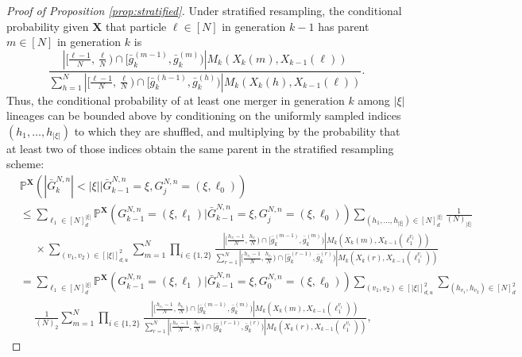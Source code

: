\documentclass[10pt,a4paper]{amsart}
\newcommand{\bbP}{\mathbb{P}}
\newcommand{\bfX}{\mathbf{X}}
\begin{document}
\begin{proof}[Proof of Proposition \ref{prop:stratified}]
Under stratified resampling, the conditional probability given $\bfX$ that particle $\ell \in [N]$ in generation $k - 1$ has parent $m \in [N]$ in generation $k$ is
\begin{equation*}
\frac{ | [ \frac{ \ell - 1 }{ N }, \frac{ \ell }{ N } ) \cap [ \bar{ g }_k^{ ( m - 1 ) }, \bar{ g }_k^{ ( m ) } ) | M_k( X_k( m ), X_{ k - 1 }( \ell ) ) }{ \sum_{ h = 1 }^N | [ \frac{ \ell - 1 }{ N }, \frac{ \ell }{ N } ) \cap [ \bar{ g }_k^{ ( h - 1 ) }, \bar{ g }_k^{ ( h ) } ) | M_k( X_k( h ), X_{ k - 1 }( \ell ) ) }.
\end{equation*}
Thus, the conditional probability of at least one merger in generation $k$ among $| \xi |$ lineages can be bounded above by conditioning on the uniformly sampled indices $( h_1, \ldots, h_{ | \xi | } )$ to which they are shuffled, and multiplying by the probability that at least two of those indices obtain the same parent in the stratified resampling scheme:
\begin{align*}
&\bbP^{ \bfX }( | \bar{ G }_k^{ N, n } | < | \xi | | \bar{ G }_{ k - 1 }^{ N, n } = \xi, G_j^{ N, n } = ( \xi, \ell_0 ) ) \\
&\leq \sum_{ \ell_1 \in [ N ]_d^{ | \xi | } } \bbP^{ \bfX }( G_{ k - 1 }^{ N, n } = ( \xi, \ell_1 ) | \bar{ G }_{ k - 1 }^{ N, n } = \xi, G_j^{ N, n } = ( \xi, \ell_0 ) ) \sum_{ ( h_1, \ldots, h_{ | \xi | } ) \in [ N ]_d^{ | \xi | } }  \frac{ 1 }{ ( N )_{ | \xi | } } \\
&\phantom{=} \times \sum_{ ( v_1, v_2 ) \in [ | \xi | ]_{ d, u }^2 } \sum_{ m = 1 }^N \prod_{ i \in \{ 1, 2 \} } \frac{ | [ \frac{ h_{ v_i } - 1 }{ N }, \frac{ h_{ v_i } }{ N } ) \cap [ \bar{ g }_k^{ ( m - 1 ) }, \bar{ g }_k^{ ( m ) } ) | M_k( X_k( m ), X_{ k - 1 }( \ell_1^{ v_i } ) ) }{ \sum_{ r = 1 }^N | [ \frac{ h_{ v_i } - 1 }{ N }, \frac{ h_{ v_i } }{ N } ) \cap [ \bar{ g }_k^{ ( r - 1 ) }, \bar{ g }_k^{ ( r ) } ) | M_k( X_k( r ), X_{ k - 1 }( \ell_1^{ v_i } ) ) } \\
&= \sum_{ \ell_1 \in [ N ]_d^{ | \xi | } } \bbP^{ \bfX }( G_{ k - 1 }^{ N, n } = ( \xi, \ell_1 ) | \bar{ G }_{ k - 1 }^{ N, n } = \xi, G_0^{ N, n } = ( \xi, \ell_0 ) ) \sum_{ ( v_1, v_2 ) \in [ | \xi | ]_{ d, u }^2 } \sum_{ ( h_{ v_1 }, h_{ v_2 } ) \in [ N ]_d^2 } \\
&\phantom{=} \frac{ 1 }{ ( N )_2 } \sum_{ m = 1 }^N \prod_{ i \in \{ 1, 2 \} } \frac{ | [ \frac{ h_{ v_i } - 1 }{ N }, \frac{ h_{ v_i } }{ N } ) \cap [ \bar{ g }_k^{ ( m - 1 ) }, \bar{ g }_k^{ ( m ) } ) | M_k( X_k( m ), X_{ k - 1 }( \ell_1^{ v_i } ) ) }{ \sum_{ r = 1 }^N | [ \frac{ h_{ v_i } - 1 }{ N }, \frac{ h_{ v_i } }{ N } ) \cap [ \bar{ g }_k^{ ( r - 1 ) }, \bar{ g }_k^{ ( r ) } ) | M_k( X_k( r ), X_{ k - 1 }( \ell_1^{ v_i } ) ) },

\end{align*}
\end{proof}
\end{document}
